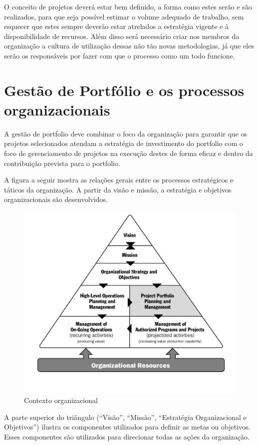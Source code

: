 \documentclass[12pt,a4paper,ruledheader,tocpage=prefix,floatnumber=continuous,pagestart=folhaderosto,font=times]{abnt}
\begin{document}
O conceito de projetos deverá estar bem definido, a forma como estes serão e são realizados, para que seja possível estimar o volume adequado de trabalho,
sem esquecer que estes sempre deverão estar atrelados a estratégia vigente e à disponibilidade de recursos. Além disso será necessário criar nos membros 
da organização a cultura de utilização dessas não tão novas metodologias, já que eles serão os responsáveis por fazer com que o processo como um todo 
funcione.

\section{Gestão de Portfólio e os processos organizacionais}
A gestão de portfolio deve combinar o foco da organização para garantir que os projetos selecionados atendam a estratégia de investimento do 
portfolio com o foco de gerenciamento de projetos na execução destes de forma eficaz e dentro da contribuição prevista para o portfolio.

A figura a seguir mostra as relações gerais entre os processos estratégicos e táticos da organização. A partir da visão e missão, a estratégia e 
objetivos organizacionais são desenvolvidos.

\begin{figure}[H]
\centering
\includegraphics[width=.9\textwidth]{organizacional_port.jpg}
\caption{Contexto organizacional}
\end{figure}

A parte superior do triângulo (``Visão'', ``Missão'', ``Estratégia Organizacional e Objetivos'') ilustra os componentes utilizados para definir  as metas 
ou objetivos. Esses componentes são utilizados para direcionar todas as ações da organização. 
\end{document}
